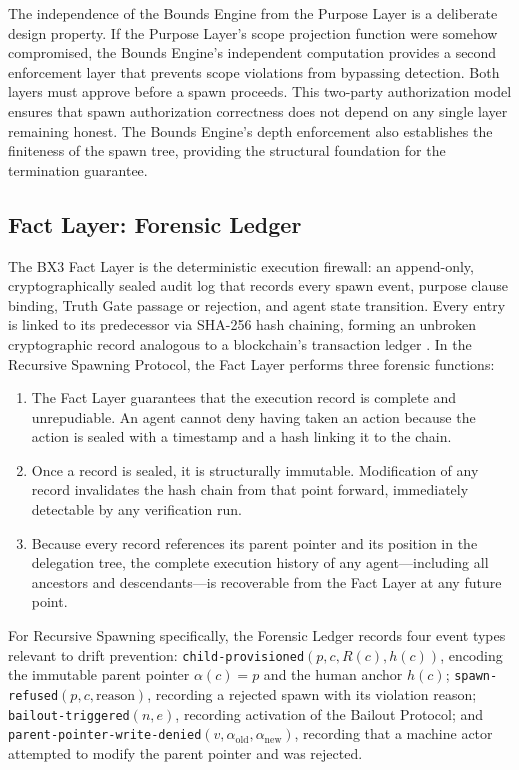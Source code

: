 The independence of the Bounds Engine from the Purpose Layer is a deliberate design property. If the Purpose Layer's scope projection function were somehow compromised, the Bounds Engine's independent computation provides a second enforcement layer that prevents scope violations from bypassing detection. Both layers must approve before a spawn proceeds. This two-party authorization model ensures that spawn authorization correctness does not depend on any single layer remaining honest. The Bounds Engine's depth enforcement also establishes the finiteness of the spawn tree, providing the structural foundation for the termination guarantee.

\subsection{Fact Layer: Forensic Ledger}

The BX3 Fact Layer is the deterministic execution firewall: an append-only, cryptographically sealed audit log that records every spawn event, purpose clause binding, Truth Gate passage or rejection, and agent state transition. Every entry is linked to its predecessor via SHA-256 hash chaining, forming an unbroken cryptographic record analogous to a blockchain's transaction ledger \cite{nakamoto2008bitcoin,laurie2013certificate}. In the Recursive Spawning Protocol, the Fact Layer performs three forensic functions:

\begin{enumerate}
  \item[\textbf{Completeness.}] The Fact Layer guarantees that the execution record is complete and unrepudiable. An agent cannot deny having taken an action because the action is sealed with a timestamp and a hash linking it to the chain.
  \item[\textbf{Immutability.}] Once a record is sealed, it is structurally immutable. Modification of any record invalidates the hash chain from that point forward, immediately detectable by any verification run.
  \item[\textbf{Reconstructability.}] Because every record references its parent pointer and its position in the delegation tree, the complete execution history of any agent---including all ancestors and descendants---is recoverable from the Fact Layer at any future point.
\end{enumerate}

For Recursive Spawning specifically, the Forensic Ledger records four event types relevant to drift prevention: \texttt{child-provisioned}$(p, c, R(c), h(c))$, encoding the immutable parent pointer $\alpha(c) = p$ and the human anchor $h(c)$; \texttt{spawn-refused}$(p, c, \text{reason})$, recording a rejected spawn with its violation reason; \texttt{bailout-triggered}$(n, e)$, recording activation of the Bailout Protocol; and \texttt{parent-pointer-write-denied}$(v, \alpha_{\text{old}}, \alpha_{\text{new}})$, recording that a machine actor attempted to modify the parent pointer and was rejected.

